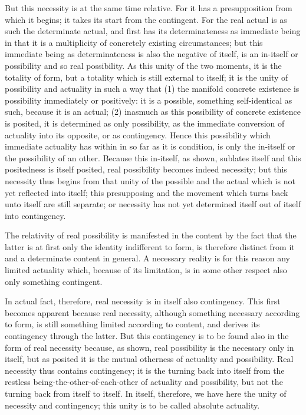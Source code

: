 But this necessity is at the same time relative.
For it has a presupposition from which it begins;
it takes its start from the contingent.
For the real actual is as such the determinate actual,
and first has its determinateness as immediate being
in that it is a multiplicity of concretely existing circumstances;
but this immediate being as determinateness is also the negative of
itself, is an in-itself or possibility and so real possibility.
As this unity of the two moments, it is the totality of form,
but a totality which is still external to itself;
it is the unity of possibility and actuality in such a way that
(1) the manifold concrete existence is possibility immediately or positively:
it is a possible, something self-identical as such, because it is an actual;
(2) inasmuch as this possibility of concrete existence is posited,
it is determined as only possibility,
as the immediate conversion of actuality into its opposite, or as contingency.
Hence this possibility which immediate actuality has within
in so far as it is condition, is only the in-itself
or the possibility of an other.
Because this in-itself, as shown, sublates itself and this positedness
is itself posited, real possibility becomes indeed necessity;
but this necessity thus begins from that unity of the possible and the actual
which is not yet reflected into itself;
this presupposing and the movement which turns back
unto itself are still separate;
or necessity has not yet determined itself
out of itself into contingency.

The relativity of real possibility is manifested in the content
by the fact that the latter is at first only
the identity indifferent to form,
is therefore distinct from it
and a determinate content in general.
A necessary reality is for this reason any limited actuality
which, because of its limitation, is in some other respect
also only something contingent.

In actual fact, therefore, real necessity is
in itself also contingency.
This first becomes apparent because real necessity,
although something necessary according to form,
is still something limited according to content,
and derives its contingency through the latter.
But this contingency is to be found also
in the form of real necessity because, as shown,
real possibility is the necessary only in itself,
but as posited it is the mutual otherness of
actuality and possibility.
Real necessity thus contains contingency;
it is the turning back into itself from the restless
being-the-other-of-each-other of actuality and possibility,
but not the turning back from itself to itself.
In itself, therefore, we have here the unity
of necessity and contingency;
this unity is to be called absolute actuality.


